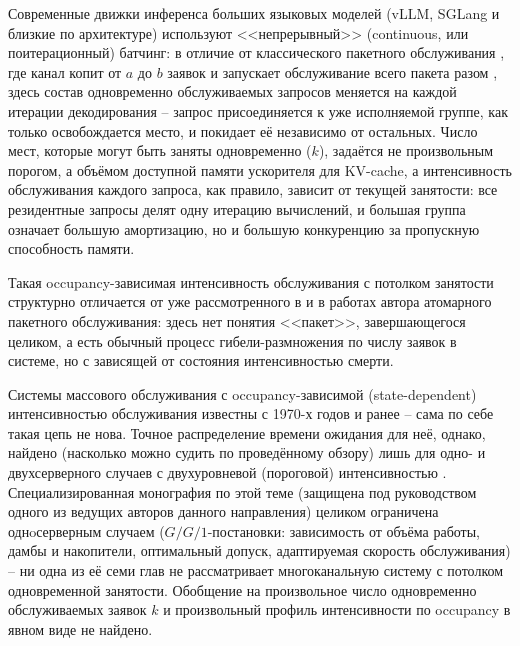 \documentclass[12pt,a4paper]{article}
\newcommand{\articlesection}[1]{\par\vspace{14pt}{\bfseries #1}\par\vspace{6pt}\nopagebreak}
\begin{document}
\renewcommand{\figurename}{Рисунок}
\renewcommand{\tablename}{Таблица}

\articlesection{Введение}

Современные движки инференса больших языковых моделей (vLLM, SGLang и близкие по архитектуре) используют <<непрерывный>> (continuous, или поитерационный) батчинг: в отличие от классического пакетного обслуживания \cite{bailey1954}, где канал копит от $a$ до $b$ заявок и запускает обслуживание всего пакета разом \cite{inoue2021}, здесь состав одновременно обслуживаемых запросов меняется на каждой итерации декодирования -- запрос присоединяется к уже исполняемой группе, как только освобождается место, и покидает её независимо от остальных. Число мест, которые могут быть заняты одновременно ($k$), задаётся не произвольным порогом, а объёмом доступной памяти ускорителя для KV-cache, а интенсивность обслуживания каждого запроса, как правило, зависит от текущей занятости: все резидентные запросы делят одну итерацию вычислений, и большая группа означает большую амортизацию, но и большую конкуренцию за пропускную способность памяти.

Такая occupancy-зависимая интенсивность обслуживания с потолком занятости структурно отличается от уже рассмотренного в \cite{inoue2021} и в работах автора \cite{khabarovsingle2026,khabarovmulti2026,khabarovoccupancy2026} атомарного пакетного обслуживания: здесь нет понятия <<пакет>>, завершающегося целиком, а есть обычный процесс гибели-размножения по числу заявок в системе, но с зависящей от состояния интенсивностью смерти.

Системы массового обслуживания с occupancy-зависимой (state-dependent) интенсивностью обслуживания известны с 1970-х годов \cite{morrison1989} и ранее -- сама по себе такая цепь не нова. Точное распределение времени ожидания для неё, однако, найдено (насколько можно судить по проведённому обзору) лишь для одно- и двухсерверного случаев с двухуровневой (пороговой) интенсивностью \cite{morrison1989}. Специализированная монография по этой теме \cite{bekker2005} (защищена под руководством одного из ведущих авторов данного направления) целиком ограничена однoсерверным случаем ($G/G/1$-постановки: зависимость от объёма работы, дамбы и накопители, оптимальный допуск, адаптируемая скорость обслуживания) -- ни одна из её семи глав не рассматривает многоканальную систему с потолком одновременной занятости. Обобщение на произвольное число одновременно обслуживаемых заявок $k$ и произвольный профиль интенсивности по occupancy в явном виде не найдено.
\end{document}
